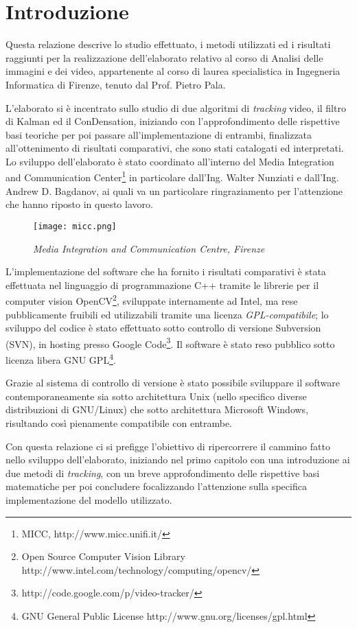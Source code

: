 \section{Introduzione}
Questa relazione descrive lo studio effettuato, i metodi utilizzati ed i risultati raggiunti per la realizzazione dell'elaborato relativo al corso di Analisi delle immagini e dei video, appartenente al corso di laurea specialistica in Ingegneria Informatica di Firenze, tenuto dal Prof. Pietro Pala.

L'elaborato si è incentrato sullo studio di due algoritmi di \textit{tracking} video, il filtro di Kalman ed il ConDensation, iniziando con l'approfondimento delle rispettive basi teoriche per poi passare all'implementazione di entrambi, finalizzata all'ottenimento di risultati comparativi, che sono stati catalogati ed interpretati. Lo sviluppo dell'elaborato è stato coordinato all'interno del Media Integration and Communication Center\footnote{MICC, http://www.micc.unifi.it/} in particolare dall'Ing. Walter Nunziati e dall'Ing. Andrew D. Bagdanov, ai quali va un particolare ringraziamento per l'attenzione che hanno riposto in questo lavoro.
\begin{figure}[hb]
\centering
	\texttt{[image: micc.png]}
\caption{\textit{Media Integration and Communication Centre, Firenze}\label{fig:micc}}
\end{figure}

L'implementazione del software che ha fornito i risultati comparativi è stata effettuata nel linguaggio di programmazione C++ tramite le librerie per il computer vision OpenCV\footnote{Open Source Computer Vision Library http://www.intel.com/technology/computing/opencv/}, sviluppate internamente ad Intel, ma rese pubblicamente fruibili ed utilizzabili tramite una licenza \textit{GPL-compatibile}; lo sviluppo del codice è stato effettuato sotto controllo di versione Subversion (SVN), in hosting presso Google Code\footnote{http://code.google.com/p/video-tracker/}. Il software è stato reso pubblico sotto licenza libera GNU GPL\footnote{GNU General Public License http://www.gnu.org/licenses/gpl.html}.

Grazie al sistema di controllo di versione è stato possibile sviluppare il software contemporaneamente sia sotto architettura Unix (nello specifico diverse distribuzioni di GNU/Linux) che sotto architettura Microsoft Windows, risultando così pienamente compatibile con entrambe.

Con questa relazione ci si prefigge l'obiettivo di ripercorrere il cammino fatto nello sviluppo dell'elaborato, iniziando nel primo capitolo con una introduzione ai due metodi di \textit{tracking}, con un breve approfondimento delle rispettive basi matematiche per poi concludere focalizzando l'attenzione sulla specifica implementazione del modello utilizzato.

